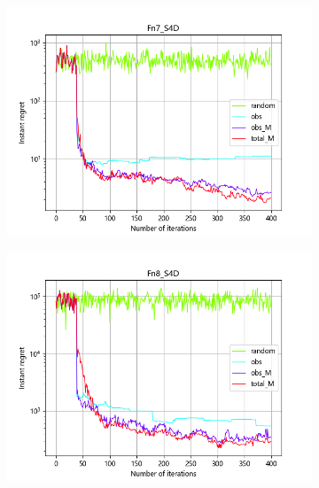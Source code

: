 \documentclass{article}
\begin{document}
\begin{figure}[H]
\begin{subfigure}[t]{.32\linewidth}
        \includegraphics[width=1\textwidth]{pictures/Homo_noise_4D/S/Fn7_S4D_ins.png}
    \end{subfigure}
    \begin{subfigure}[t]{.32\linewidth}
        \centering
        \includegraphics[width=1\textwidth]{pictures/Homo_noise_4D/S/Fn8_S4D_ins.png}
    \end{subfigure}
    \begin{subfigure}[t]{.32\linewidth}
        \centering

\end{subfigure}
\end{figure}
\end{document}
